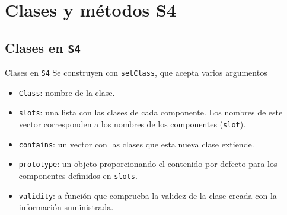 \documentclass[xcolor={usenames,svgnames,dvipsnames}]{beamer}
\begin{document}
\section{Clases y métodos S4}
\label{sec:orgf4512c3}

\subsection{Clases en \texttt{S4}}
\label{sec:org4593bca}
\begin{frame}[fragile,label={sec:org6709b63}]{Clases en \texttt{S4}}
 Se construyen con \texttt{setClass}, que acepta varios argumentos
\begin{itemize}
\item \texttt{Class}: nombre de la clase.
\item \texttt{slots}: una lista con las clases de cada componente. Los nombres de este vector corresponden a los nombres de los componentes (\texttt{slot}).
\item \texttt{contains}: un vector con las clases que esta nueva clase extiende.
\item \texttt{prototype}: un objeto proporcionando el contenido por defecto para los componentes definidos en \texttt{slots}.
\item \texttt{validity}: a función que comprueba la validez de la clase creada con la información suministrada.
\end{itemize}
\end{frame}
\end{document}
